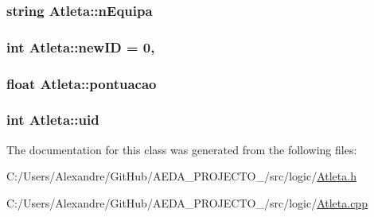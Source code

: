 \subsubsection[{n\+Equipa}]{\setlength{\rightskip}{0pt plus 5cm}string Atleta\+::n\+Equipa\hspace{0.3cm}{\ttfamily [private]}}\label{class_atleta_af159b255beef6455905f0c871355b1ee}
\hypertarget{class_atleta_af206b52d53b2e4c5dfd4fec66bf1965c}{}
\subsubsection[{new\+I\+D}]{\setlength{\rightskip}{0pt plus 5cm}int Atleta\+::new\+I\+D = 0\hspace{0.3cm}{\ttfamily [static]}, {\ttfamily [private]}}\label{class_atleta_af206b52d53b2e4c5dfd4fec66bf1965c}
\hypertarget{class_atleta_ac7fb325ccbe94fe9494d54da4c08b045}{}
\subsubsection[{pontuacao}]{\setlength{\rightskip}{0pt plus 5cm}float Atleta\+::pontuacao\hspace{0.3cm}{\ttfamily [private]}}\label{class_atleta_ac7fb325ccbe94fe9494d54da4c08b045}
\hypertarget{class_atleta_ae471f8c198a8a84275afa23598e03d44}{}
\subsubsection[{uid}]{\setlength{\rightskip}{0pt plus 5cm}int Atleta\+::uid\hspace{0.3cm}{\ttfamily [private]}}\label{class_atleta_ae471f8c198a8a84275afa23598e03d44}


The documentation for this class was generated from the following files\+:\begin{DoxyCompactItemize}
\item 
C\+:/\+Users/\+Alexandre/\+Git\+Hub/\+A\+E\+D\+A\+\_\+\+P\+R\+O\+J\+E\+C\+T\+O\+\_/src/logic/\hyperlink{_atleta_8h}{Atleta.\+h}\item 
C\+:/\+Users/\+Alexandre/\+Git\+Hub/\+A\+E\+D\+A\+\_\+\+P\+R\+O\+J\+E\+C\+T\+O\+\_/src/logic/\hyperlink{_atleta_8cpp}{Atleta.\+cpp}\end{DoxyCompactItemize}
